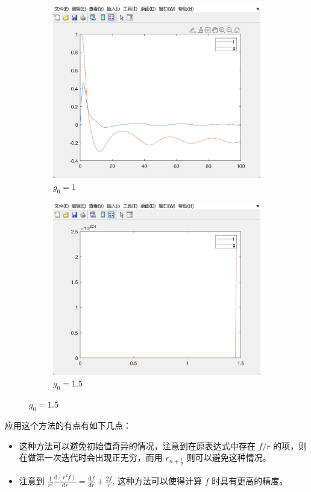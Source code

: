 \documentclass[11pt]{ctexart}
\begin{document}
\begin{figure}[H]
		\begin{subfigure}[h]{0.4\textwidth}
			\includegraphics[width=\textwidth]{picture/exp3_1_3}
			\caption{\(g_0=1\)}
		\end{subfigure}
		\begin{subfigure}[h]{0.4\textwidth}
			\includegraphics[width=\textwidth]{picture/exp3_1_4}
			\caption{\(g_0=1.5\)}
		\end{subfigure}
		\label{fig:}
	\end{figure}

	应用这个方法的有点有如下几点：
	\begin{itemize}
		\item 这种方法可以避免初始值奇异的情况，注意到在原表达式中存在 \(f/r\) 的项，则在做第一次迭代时会出现正无穷，而用
		\(r_{n+\frac{1}{2}}\) 则可以避免这种情况。
		\item 注意到 \(\frac{1}{r^2}\frac{\text{d}(r^2 f)}{\text{d}r}=
		\frac{\text{d}f}{\text{d}r}+\frac{2f}{r}\), 这种方法可以使得计算 \(f\) 时具有更高的精度。
	\end{itemize}
\end{document}
